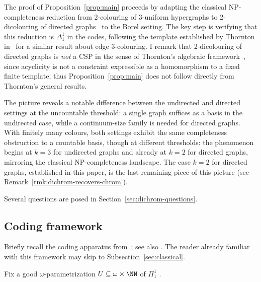 The proof of Proposition~\ref{prop:main} proceeds by adapting the classical NP-completeness reduction from 2-colouring of 3-uniform hypergraphs to 2-dicolouring of directed graphs~\cite{Bokal_2004_CircularChrom} to the Borel setting.
The key step is verifying that this reduction is $\Delta^1_1$ in the codes, following the template established by Thornton in~\cite[Appendix~A]{thornton-thesis} for a similar result about edge 3-colouring.
I remark that 2-dicolouring of directed graphs is \emph{not} a CSP in the sense of Thornton's algebraic framework~\cite{thornton2022algebraic}, since acyclicity is not a constraint expressible as a homomorphism to a fixed finite template; thus Proposition~\ref{prop:main} does not follow directly from Thornton's general results.

The picture reveals a notable difference between the undirected and directed settings at the uncountable threshold: a single graph suffices as a basis in the undirected case, while a continuum-size family is needed for directed graphs.
With finitely many colours, both settings exhibit the same completeness obstruction to a countable basis, though at different thresholds: the phenomenon begins at $k=3$ for undirected graphs and already at $k=2$ for directed graphs, mirroring the classical NP-completeness landscape.
The case $k=2$ for directed graphs, established in this paper, is the last remaining piece of this picture (see Remark~\ref{rmk:dichrom-recovers-chrom}).

Several questions are posed in Section~\ref{sec:dichrom-questions}.

\subsection{Coding framework}\label{sec:framework}

Briefly recall the coding apparatus from~\cite[Appendix~A]{thornton-thesis}; see also \cite[Section~4]{thornton2022algebraic}.
The reader already familiar with this framework may skip to Subsection~\ref{sec:classical}.

Fix a good $\omega$-parametrization $U\subseteq\omega\times\NN$ of $\Pi^1_1$ \cite[Theorem~A.5]{thornton2022algebraic}.

